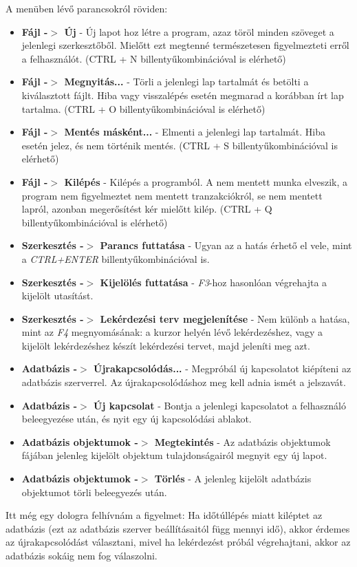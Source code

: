 A menüben lévő parancsokról röviden:
\begin{itemize}
  \item \textbf{Fájl -$>$ Új} - Új lapot hoz létre a program, azaz töröl minden szöveget a jelenlegi szerkesztőből. Mielőtt ezt megtenné
természetesen figyelmezteti erről a felhasználót. (CTRL + N billentyűkombinációval is elérhető)
  \item \textbf{Fájl -$>$ Megnyitás...} - Törli a jelenlegi lap tartalmát és betölti a kiválasztott fájlt. Hiba vagy visszalépés esetén
  megmarad a korábban írt lap tartalma. (CTRL + O billentyűkombinációval is elérhető)
  \item \textbf{Fájl -$>$ Mentés másként...} - Elmenti a jelenlegi lap tartalmát. Hiba esetén jelez, és nem történik mentés.
  (CTRL + S billentyűkombinációval is elérhető)
  \item \textbf{Fájl -$>$ Kilépés} - Kilépés a programból. A nem mentett munka elveszik, a program nem figyelmeztet nem mentett tranzakciókról,
  se nem mentett lapról, azonban megerősítést kér mielőtt kilép. (CTRL + Q billentyűkombinációval is elérhető)
  \item \textbf{Szerkesztés -$>$ Parancs futtatása} - Ugyan az a hatás érhető el vele, mint a \textit{CTRL+ENTER} billentyűkombinációval is.
  \item \textbf{Szerkesztés -$>$ Kijelölés futtatása} - \textit{F3}-hoz hasonlóan végrehajta a kijelölt utasítást.
  \item \textbf{Szerkesztés -$>$ Lekérdezési terv megjelenítése} - Nem különb a hatása, mint az \textit{F4} megnyomásának: a kurzor helyén lévő lekérdezéshez,
  vagy a kijelölt lekérdezéshez készít lekérdezési tervet, majd jeleníti meg azt.
  \item \textbf{Adatbázis -$>$ Újrakapcsolódás...} - Megpróbál új kapcsolatot kiépíteni az adatbázis szerverrel. Az újrakapcsolódáshoz meg kell adnia ismét
  a jelszavát.
  \item \textbf{Adatbázis -$>$ Új kapcsolat} - Bontja a jelenlegi kapcsolatot a felhasználó beleegyezése után, és nyit egy új kapcsolódási ablakot.
  \item \textbf{Adatbázis objektumok -$>$ Megtekintés} - Az adatbázis objektumok fájában jelenleg kijelölt objektum tulajdonságairól megnyit egy új lapot.
  \item \textbf{Adatbázis objektumok -$>$ Törlés} - A jelenleg kijelölt adatbázis objektumot törli beleegyezés után.
\end{itemize}

Itt még egy dologra felhívnám a figyelmet: Ha időtúllépés miatt kiléptet az adatbázis (ezt az adatbázis szerver beállításaitól függ mennyi idő), akkor
érdemes az újrakapcsolódást választani, mivel ha lekérdezést próbál végrehajtani, akkor az adatbázis sokáig nem fog válaszolni.


